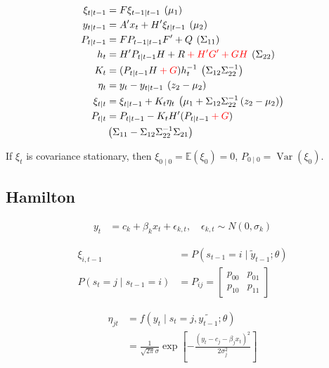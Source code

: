 \begin{align*}
    \xi_{t \mid t-1}&=F \xi_{t-1 \mid t-1} \:\left(\mu_1\right) \\
    y_{t \mid t-1}&=A^{\prime} x_t+H^{\prime} \xi_{t \mid t-1} \:\left(\mu_2\right) \\
    P_{t \mid t-1}&=F P_{t-1 \mid t-1} F^{\prime}+Q \:\left(\Sigma_{11}\right) \\
    h_t&=H^{\prime} P_{t \mid t-1} H+R
    \color{red} + H^\prime G^\prime + GH \color{black} \:\left(\Sigma_{22}\right) \\
    K_t&=(P_{t \mid t-1} H \color{red} + G \color{black})h_t^{-1} \:\left(\Sigma_{12} \Sigma_{22}^{-1}\right) \\
    \eta_t&=y_t-y_{t \mid t-1} \:\left(z_2-\mu_2\right) \\
    \xi_{t \mid t}&=\xi_{t \mid t-1}+K_t \eta_t \:\left(\mu_1+\Sigma_{12} \Sigma_{22}^{-1}\left(z_2-\mu_2\right)\right) \\
    P_{t \mid t}&=P_{t \mid t-1}-K_t H^{\prime} (P_{t \mid t-1}\color{red}+G\color{black}) \\
    &\left(\Sigma_{11}-\Sigma_{12} \Sigma_{22}^{-1} \Sigma_{21}\right)
\end{align*}

If $\xi_t$ is covariance stationary, then $\xi_{0 \mid 0}=\mathbb{E}\left(\xi_0\right)=0$, $P_{0 \mid 0}=\operatorname{Var}\left(\xi_0\right)$.

\subsection{Hamilton}

\begin{align*}
    y_t&=c_k+\beta_k x_t+\epsilon_{k, t}, \quad \epsilon_{k, t} \sim N\left(0, \sigma_k\right)
\end{align*}

\begin{align*}
    \xi_{i, t-1}&=P\left(s_{t-1}=i \mid \tilde{y}_{t-1} ; \theta\right) \\
    P\left(s_t=j \mid s_{t-1}=i\right)&=P_{i j}=\left[
        \begin{array}{ll}
        p_{00} & p_{01} \\
        p_{10} & p_{11}
        \end{array}
    \right]
\end{align*}

\begin{align*}
    \eta_{j t} & =f\left(y_t \mid s_t=j, \tilde{y_{t-1}} ; \theta\right) \\
    & =\frac{1}{\sqrt{2 \pi} \sigma} \exp \left[-\frac{\left(y_t-c_j-\beta_j x_t\right)^2}{2 \sigma_j^2}\right]
\end{align*}

